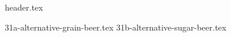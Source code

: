 \clearpage
{}
\divisorLine

{header.tex}

\begin{multicols}{2}

{31a-alternative-grain-beer.tex}
{31b-alternative-sugar-beer.tex}

\end{multicols}